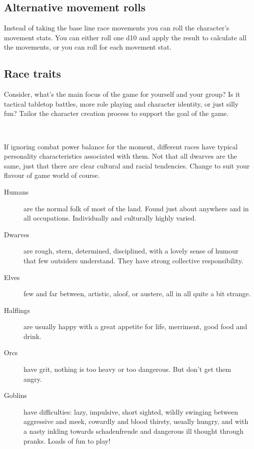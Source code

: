 \subsection*{Alternative movement rolls}
Instead of taking the base line race movements you can roll the character's movement stats. You can either roll one d10 and apply the result to calculate all the movements, or you can roll for each movement stat.


\subsection*{Race traits}
Consider, what's the main focus of the game for yourself and your group? Is it tactical tabletop battles, more role playing and character identity, or just silly fun? Tailor the character creation process to support the goal of the game.

\

If ignoring combat power balance for the moment, different races have typical personality characteristics associated with them. Not that all dwarves are the same, just that there are clear cultural and racial tendencies. Change to suit your flavour of game world of course.

\begin{description}
\item[Humans] are the normal folk of most of the land. Found just about anywhere and in all occupations. Individually and culturally highly varied.
\item[Dwarves] are rough, stern, determined, disciplined, with a lovely sense of humour that few outsiders understand. They have strong collective responsibility.
\item[Elves] few and far between, artistic, aloof, or austere, all in all quite a bit strange. 
\item[Halflings] are usually happy with a great appetite for life, merriment, good food and drink.
\item[Orcs] have grit, nothing is too heavy or too dangerous. But don't get them angry.
\item[Goblins] have difficulties: lazy, impulsive, short sighted, wildly swinging between aggressive and meek, cowardly and blood thirsty, usually hungry, and with a nasty inkling towards schadenfreude and dangerous ill thought through pranks. Loads of fun to play!
\end{description}

